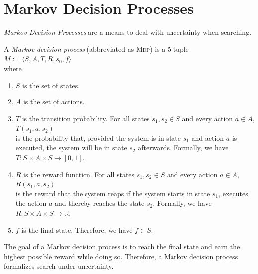 \chapter{Markov Decision Processes}
\emph{Markov Decision Processes} are a means to deal with uncertainty when searching.

\begin{Definition}
  A \emph{Markov decision process} (abbreviated as \textsc{Mdp}) is a 5-tuple
  \\[0.2cm]
  \hspace*{1.3cm}
  $M := \langle S, A, T, R, s_0, f \rangle$
  \\[0.2cm]
  where 
  \begin{enumerate}
  \item $S$ is the set of states.
  \item $A$ is the set of actions.
  \item $T$ is the transition probability.  For all states $s_1,s_2 \in S$ and every action $a \in A$,
        \\[0.2cm]
        \hspace*{1.3cm}
        $T(s_1,a,s_2)$
        \\[0.2cm]
        is the probability that, provided the system is in state $s_1$ and action $a$ is executed,
        the system will be in state $s_2$ afterwards.  Formally, we have
        \\[0.2cm]
        \hspace*{1.3cm}
        $T:S \times A \times S \rightarrow [0,1]$.
  \item $R$ is the reward function.  For all states $s_1,s_2 \in S$ and every action $a \in A$,
        \\[0.2cm]
        \hspace*{1.3cm}
        $R(s_1,a,s_2)$
        \\[0.2cm]
        is the reward that the system reaps if the system starts in state $s_1$, executes the action
        $a$ and thereby reaches the state $s_2$.  Formally, we have
        \\[0.2cm]
        \hspace*{1.3cm}
        $R:S \times A \times S \rightarrow \mathbb{R}$. 
  \item $f$ is the final state. Therefore, we have $f \in S$.  
  \end{enumerate}
  The goal of a Markov decision process is to reach the final state and earn the highest possible
  reward while doing so.  Therefore, a Markov decision process formalizes search under uncertainty.
\eox
\end{Definition}

